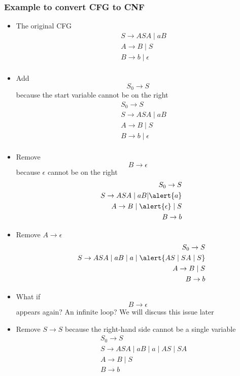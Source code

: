 \begin{frame}[allowframebreaks] \frametitle{Example to convert CFG to CNF}
  \begin{itemize}
\item The original CFG
  \begin{eqnarray*}
&& S \rightarrow ASA\mid aB\\
&& A \rightarrow B\mid S\\
&& B \rightarrow b \mid \epsilon\\
\end{eqnarray*}
\item Add
  \begin{equation*}
S_0 \rightarrow S
\end{equation*}
because the start variable cannot be on the right
  \begin{eqnarray*}
&& S_0 \rightarrow S\\
&& S \rightarrow ASA\mid aB\\
&& A \rightarrow B\mid S\\
&& B \rightarrow b \mid \epsilon\\
\end{eqnarray*}
\item Remove
  \begin{equation*}
  B \rightarrow \epsilon 
\end{equation*}
because $\epsilon$ cannot be on the right
\begin{eqnarray*}
&& S_0 \rightarrow S\\
&& S \rightarrow ASA\mid aB|\alert{a}\\
&& A \rightarrow B\mid \alert{\epsilon} \mid S\\
&& B \rightarrow b\\
\end{eqnarray*}
\item Remove $A\rightarrow \epsilon$ 
\begin{eqnarray*}
&& S_0 \rightarrow S\\
&& S \rightarrow ASA\mid aB\mid a \mid \alert{AS\mid SA \mid S}\\
&& A \rightarrow B\mid S\\
&& B \rightarrow b
\end{eqnarray*}
\item What if
  \begin{equation*}
    B \rightarrow \epsilon
  \end{equation*}
appears again? An infinite loop? We will discuss this issue later
\item Remove $S\rightarrow S$ because the right-hand side
  cannot be a single variable
\begin{eqnarray*}
&& S_0 \rightarrow S\\
&& S \rightarrow ASA\mid aB\mid a \mid AS\mid SA\\
&& A \rightarrow B\mid S\\
&& B \rightarrow b
\end{eqnarray*}
 

\end{itemize}
\end{frame}
